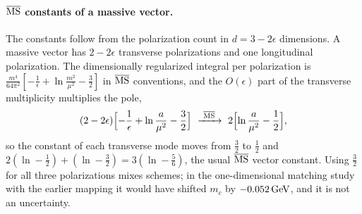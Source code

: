 \paragraph{$\overline{\mathrm{MS}}$ constants of a massive vector.}
The constants follow from the polarization count in $d=3-2\epsilon$ dimensions.
A massive vector has $2-2\epsilon$ transverse polarizations and one longitudinal polarization.
The dimensionally regularized integral per polarization is $\frac{m^4}{64\pi^2}[-\frac1\epsilon+\ln\frac{m^2}{\mu^2}-\frac32]$ in $\overline{\mathrm{MS}}$ conventions, and the $O(\epsilon)$ part of the transverse multiplicity multiplies the pole,
\begin{equation}
(2-2\epsilon)\Bigl[-\frac1\epsilon+\ln\frac{a}{\mu^2}-\frac32\Bigr]\ \xrightarrow{\ \MSbar\ }\ 2\Bigl[\ln\frac{a}{\mu^2}-\frac12\Bigr],
\label{eq:rb-polcount}
\end{equation}
so the constant of each transverse mode moves from $\frac32$ to $\frac12$ and $2(\ln-\frac12)+(\ln-\frac32)=3(\ln-\frac56)$, the usual $\overline{\mathrm{MS}}$ vector constant.
Using $\frac32$ for all three polarizations mixes schemes; in the one-dimensional matching study with the earlier mapping it would have shifted $m_c$ by $-0.052\,\mathrm{GeV}$, and it is not an uncertainty. %

